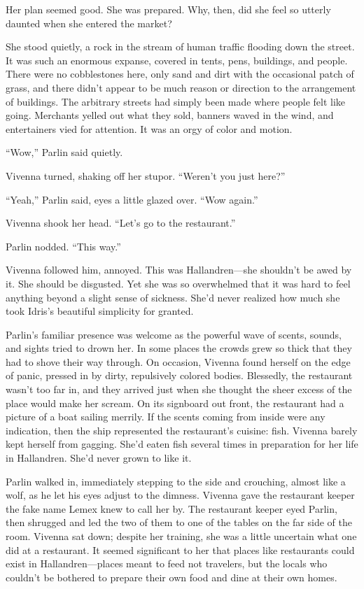 Her plan seemed good. She was prepared. Why, then, did she feel so utterly daunted when she entered the market?

She stood quietly, a rock in the stream of human traffic flooding down the street. It was such an enormous expanse, covered in tents, pens, buildings, and people. There were no cobblestones here, only sand and dirt with the occasional patch of grass, and there didn’t appear to be much reason or direction to the arrangement of buildings. The arbitrary streets had simply been made where people felt like going. Merchants yelled out what they sold, banners waved in the wind, and entertainers vied for attention. It was an orgy of color and motion.

“Wow,” Parlin said quietly.

Vivenna turned, shaking off her stupor. “Weren’t you just here?”

“Yeah,” Parlin said, eyes a little glazed over. “Wow again.”

Vivenna shook her head. “Let’s go to the restaurant.”

Parlin nodded. “This way.”

Vivenna followed him, annoyed. This was Hallandren—she shouldn’t be awed by it. She should be disgusted. Yet she was so overwhelmed that it was hard to feel anything beyond a slight sense of sickness. She’d never realized how much she took Idris’s beautiful simplicity for granted.

Parlin’s familiar presence was welcome as the powerful wave of scents, sounds, and sights tried to drown her. In some places the crowds grew so thick that they had to shove their way through. On occasion, Vivenna found herself on the edge of panic, pressed in by dirty, repulsively colored bodies. Blessedly, the restaurant wasn’t too far in, and they arrived just when she thought the sheer excess of the place would make her scream. On its signboard out front, the restaurant had a picture of a boat sailing merrily. If the scents coming from inside were any indication, then the ship represented the restaurant’s cuisine: fish. Vivenna barely kept herself from gagging. She’d eaten fish several times in preparation for her life in Hallandren. She’d never grown to like it.

Parlin walked in, immediately stepping to the side and crouching, almost like a wolf, as he let his eyes adjust to the dimness. Vivenna gave the restaurant keeper the fake name Lemex knew to call her by. The restaurant keeper eyed Parlin, then shrugged and led the two of them to one of the tables on the far side of the room. Vivenna sat down; despite her training, she was a little uncertain what one did at a restaurant. It seemed significant to her that places like restaurants could exist in Hallandren—places meant to feed not travelers, but the locals who couldn’t be bothered to prepare their own food and dine at their own homes.


